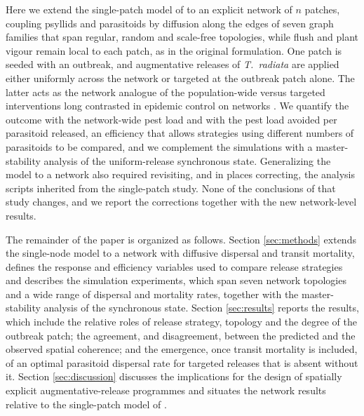 Here we extend the single-patch model of \citet{RodriguezFalcon2026} to an explicit network of $n$ patches, coupling psyllids and parasitoids by diffusion along the edges of seven graph families that span regular, random and scale-free topologies, while flush and plant vigour remain local to each patch, as in the original formulation. One patch is seeded with an outbreak, and augmentative releases of \textit{T.\ radiata} are applied either uniformly across the network or targeted at the outbreak patch alone. The latter acts as the network analogue of the population-wide versus targeted interventions long contrasted in epidemic control on networks \citep{PastorSatorras2001,Colizza2007}. We quantify the outcome with the network-wide pest load and with the pest load avoided per parasitoid released, an efficiency that allows strategies using different numbers of parasitoids to be compared, and we complement the simulations with a master-stability analysis of the uniform-release synchronous state. Generalizing the model to a network also required revisiting, and in places correcting, the analysis scripts inherited from the single-patch study. None of the conclusions of that study changes, and we report the corrections together with the new network-level results.

The remainder of the paper is organized as follows. Section \ref{sec:methods} extends the single-node model to a network with diffusive dispersal and transit mortality, defines the response and efficiency variables used to compare release strategies and describes the simulation experiments, which span seven network topologies and a wide range of dispersal and mortality rates, together with the master-stability analysis of the synchronous state. Section \ref{sec:results} reports the results, which include the relative roles of release strategy, topology and the degree of the outbreak patch; the agreement, and disagreement, between the predicted and the observed spatial coherence; and the emergence, once transit mortality is included, of an optimal parasitoid dispersal rate for targeted releases that is absent without it. Section \ref{sec:discussion} discusses the implications for the design of spatially explicit augmentative-release programmes and situates the network results relative to the single-patch model of \citet{RodriguezFalcon2026}.


